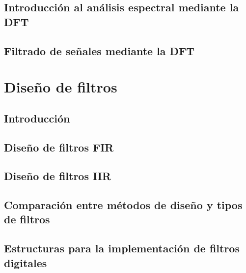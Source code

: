 \documentclass[a4paper]{book}
\numberwithin{figure}{chapter}
\numberwithin{equation}{chapter}
\begin{document}
\section{Introducción al análisis espectral mediante la DFT}
\section{Filtrado de señales mediante la DFT}

\chapter{Diseño de filtros}
\section{Introducción}
\section{Diseño de filtros FIR}
\section{Diseño de filtros IIR}
\section{Comparación entre métodos de diseño y tipos de filtros}
\section{Estructuras para la implementación de filtros digitales}

% 
\end{document}

